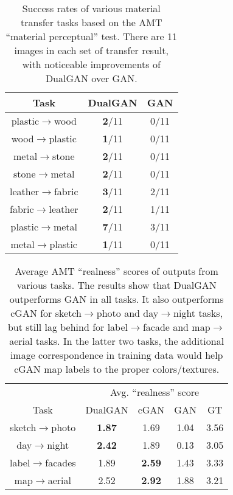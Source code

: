 \begin{table}
\begin{center}
\begin{tabular}{|c|c|c|}
\hline
Task  & DualGAN  &  GAN \\
\hline\hline
plastic$\rightarrow$wood &  \textbf{2}/11 & 0/11 \\
\hline
wood$\rightarrow$plastic &  \textbf{1}/11 & 0/11 \\
\hline
metal$\rightarrow$stone&   \textbf{2}/11 & 0/11 \\
\hline
stone$\rightarrow$metal &   \textbf{2}/11 & 0/11 \\
\hline
leather$\rightarrow$fabric &  \textbf{3}/11 & 2/11 \\
\hline
fabric$\rightarrow$leather &  \textbf{2}/11 & 1/11 \\
\hline
plastic$\rightarrow$metal &   \textbf{7}/11 & 3/11 \\
\hline
metal$\rightarrow$plastic &   \textbf{1}/11 & 0/11 \\
\hline
\end{tabular}
\caption{Success rates of various material transfer tasks based on the AMT ``material perceptual'' test. 
There are 11 images in each set of transfer result, with noticeable improvements of DualGAN over GAN.} 
\label{table:material}
\end{center}
\end{table}



\begin{table}
\tabcolsep=0.11cm
\begin{center}
\begin{tabular}{c|cccc}
\hline
	   &   \multicolumn{4}{|c}{Avg. ``realness'' score }\\
		  Task & DualGAN  &  cGAN\cite{isola2016image} & GAN & GT\\
\hline\hline

sketch$\rightarrow$photo & \textbf{1.87 }&  1.69   & 1.04  & 3.56 \\
\hline
day$\rightarrow$night &  \textbf{2.42 } & 1.89   &  0.13  & 3.05  \\
\hline
label$\rightarrow$facades & 1.89  &   \textbf{2.59 } & 1.43  & 3.33 \\
\hline
map$\rightarrow$aerial & 2.52 &  \textbf{2.92 } & 1.88  &  3.21  \\
\hline
\end{tabular}
\caption{Average AMT ``realness'' scores of outputs from various tasks. The results show that 
DualGAN outperforms GAN in all tasks. It also outperforms cGAN for sketch$\rightarrow$photo 
and day$\rightarrow$night tasks, but still lag behind for label$\rightarrow$facade and 
map$\rightarrow$aerial tasks. In the latter two tasks, the additional image correspondence in 
training data would help cGAN map labels to the proper colors/textures.}
\label{table:score}
\end{center}
\end{table}

